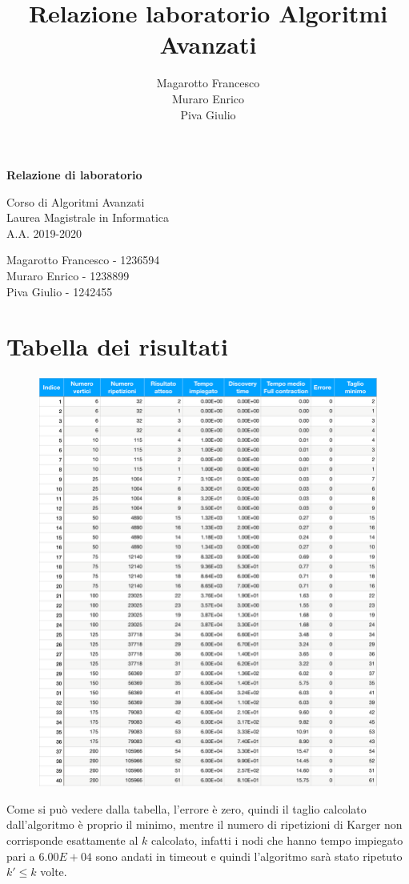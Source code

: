 \documentclass[a4paper]{article}
\title{Relazione laboratorio Algoritmi Avanzati}
\author{Magarotto Francesco\\Muraro Enrico\\Piva Giulio}
\begin{document}
\begin{titlepage}
  \vspace*{5cm}
  \begin{center}
    \Large\bfseries
    Relazione di laboratorio
  \end{center}
  \begin{center}
    \large
    Corso di Algoritmi Avanzati\\
    Laurea Magistrale in Informatica\\A.A. 2019-2020
  \end{center}
  \vspace{4cm plus 1fill}
  \begin{flushleft}
    \large
    Magarotto Francesco - 1236594\\Muraro Enrico - 1238899 \\Piva Giulio - 1242455
  \end{flushleft}
\end{titlepage}
\newpage



\section{Tabella dei risultati}
\begin{figure}[H]
	\centering
	\includegraphics[width=17cm]{tabellapdf}
	\label{fig:tabellapdf}
\end{figure}
Come si può vedere dalla tabella, l'errore è zero, quindi il taglio calcolato dall'algoritmo è proprio il minimo, mentre il numero di ripetizioni di Karger non corrisponde esattamente al $k$ calcolato, infatti i nodi che hanno tempo impiegato pari a $6.00E+04$ sono andati in timeout e quindi l'algoritmo sarà stato ripetuto $k' \leq k$ volte. 
\end{document}
